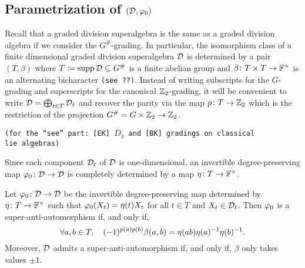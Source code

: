 \subsection{Parametrization of $(\mathcal{D}, \varphi_0)$}

Recall that a graded division superalgebra is the same as a graded division algebra if we consider the $G^\#$-grading. 
In particular, the isomorphism class of a finite dimensional graded division superalgebra $\mathcal{D}$ is determined by a pair $(T, \beta)$ where $T \coloneqq \operatorname{supp} \mathcal{D} \subseteq G^\#$ is a finite abelian group and $\beta\colon T\times T \to \mathbb{F}^\times$ is an alternating bicharacter {\tt (see ??)}. 
Instead of writing subscripts for the $G$-grading and superscripts for the canonical $\mathbb{Z}_2$-grading, it will be convenient to write $\mathcal{D} = \bigoplus_{t\in T} \mathcal{D}_t$ and recover the parity via the map $p\colon T \to \mathbb{Z}_2$ which is the restriction of the projection $G^\# = G\times \mathbb{Z}_2 \to \mathbb{Z}_2$. 

{\tt (for the ``see'' part: [EK] $D_4$ and [BK] gradings on classical \\lie algebras)}

Since each component $\mathcal{D}_t$ of $\mathcal{D}$ is one-dimensional, an invertible degree-preserving map $\varphi_0\colon \mathcal{D} \to \mathcal{D}$ is completely determined by a map $\eta\colon T \to \mathbb{F}^\times$.

\begin{prop}\label{prop:superpolarization}
    Let $\varphi_0\colon \mathcal{D} \to \mathcal{D}$ be the invertible degree-preserving map determined by $\eta\colon T \to \mathbb{F}^\times$  such that $\varphi_0(X_t) = \eta(t) X_t$ for all $t\in T$ and $X_t\in \mathcal{D}_t$. 
    Then $\varphi_0$ is a super-anti-automorphism if, and only if,
    \begin{equation}\label{eq:superpolarization}
        \forall a,b\in T, \quad (-1)^{p(a) p(b)} \beta(a,b) =  \eta(ab) \eta(a)^{-1} \eta(b)^{-1}.
    \end{equation}
    Moreover, $\mathcal{D}$ admits a super-anti-automorphism if, and only if, $\beta$ only takes values $\pm 1$.
\end{prop}

